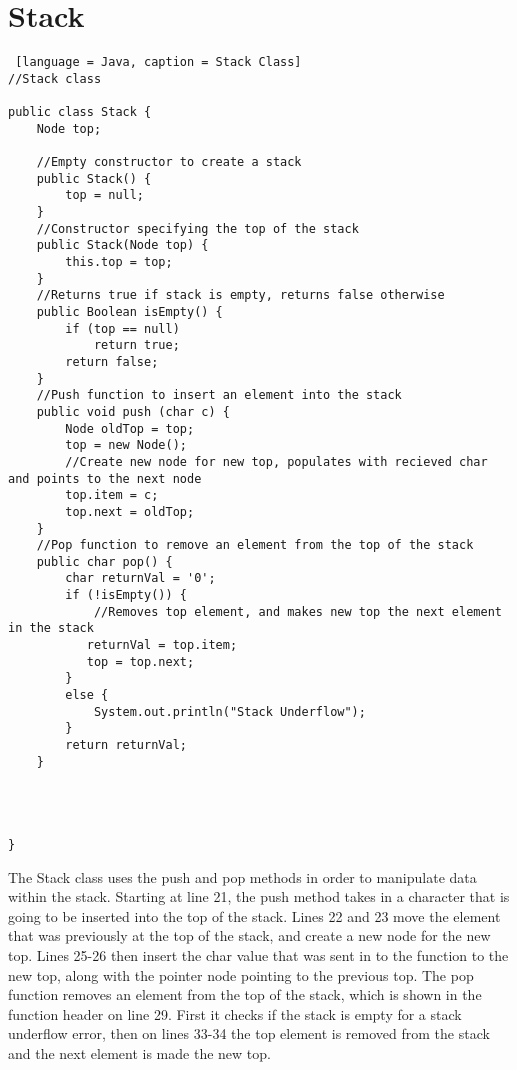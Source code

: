 \documentclass{article}
\begin{document}
\section{Stack}
\begin{lstlisting} [language = Java, caption = Stack Class]
//Stack class

public class Stack {
    Node top;

    //Empty constructor to create a stack 
    public Stack() {
        top = null;
    }
    //Constructor specifying the top of the stack
    public Stack(Node top) {
        this.top = top;
    }
    //Returns true if stack is empty, returns false otherwise
    public Boolean isEmpty() {
        if (top == null)
            return true;
        return false;
    }
    //Push function to insert an element into the stack
    public void push (char c) {
        Node oldTop = top;
        top = new Node();
        //Create new node for new top, populates with recieved char and points to the next node
        top.item = c;
        top.next = oldTop;
    }
    //Pop function to remove an element from the top of the stack
    public char pop() {
        char returnVal = '0';
        if (!isEmpty()) {
            //Removes top element, and makes new top the next element in the stack
           returnVal = top.item;
           top = top.next; 
        }
        else {
            System.out.println("Stack Underflow");
        }
        return returnVal;
    }



    
}
\end{lstlisting}
\noindent
The Stack class uses the push and pop methods in order to manipulate data within the stack. Starting at line 21, the push method takes in a character that is going to be inserted into the top of the stack. Lines 22 and 23 move the element that was previously at the top of the stack, and create a new node for the new top. Lines 25-26 then insert the char value that was sent in to the function to the new top, along with the pointer node pointing to the previous top. The pop function removes an element from the top of the stack, which is shown in the function header on line 29. First it checks if the stack is empty for a stack underflow error, then on lines 33-34 the top element is removed from the stack and the next element is made the new top. 
\end{document}

